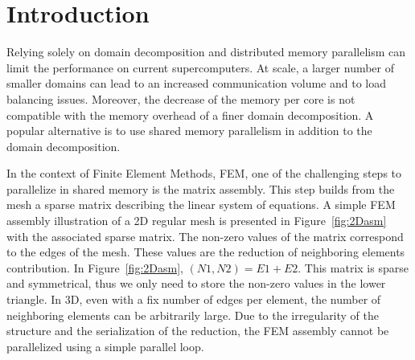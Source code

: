 \documentclass[10pt]{IOS-Book-Article}
\begin{document}
\section{Introduction}
\label{sec:intro}


Relying solely on domain decomposition and distributed memory parallelism can limit the performance on current supercomputers.
At scale, a larger number of smaller domains can lead to an increased communication volume and to load balancing issues.
Moreover, the decrease of the memory per core is not compatible with the memory overhead of a finer domain decomposition.
A popular alternative is to use shared memory parallelism in addition to the domain decomposition.

In the context of Finite Element Methods, FEM, one of the challenging steps to parallelize in shared memory is the matrix assembly.
This step builds from the mesh a sparse matrix describing the linear system of equations.
A simple FEM assembly illustration of a 2D regular mesh is presented in Figure~\ref{fig:2Dasm} with the associated sparse matrix.
The non-zero values of the matrix correspond to the edges of the mesh. These values are the reduction of neighboring elements contribution.
In Figure~\ref{fig:2Dasm}, $(N1,N2) = E1 + E2$. This matrix is sparse and symmetrical, thus we only need to store the non-zero values in the lower triangle.
In 3D, even with a fix number of edges per element, the number of neighboring elements can be arbitrarily large.
Due to the irregularity of the structure and the serialization of the reduction, the FEM assembly cannot be parallelized using a simple parallel loop.
\end{document}
